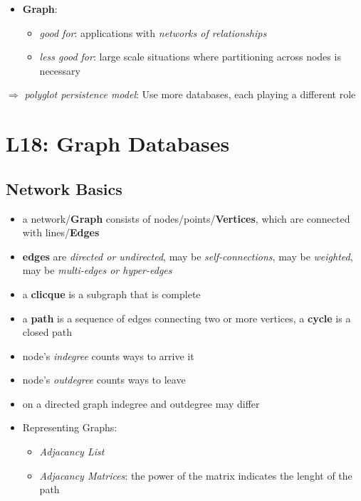 \documentclass[a4paper]{article}
\begin{document}
\begin{multicols}{3}
\begin{itemize}
\begin{itemize}
        \end{itemize}
    \item \textbf{Graph}: 
        \begin{itemize}
            \item \textit{good for}: applications with \textit{networks of relationships}
            \item \textit{less good for}: large scale situations where partitioning across nodes is necessary
        \end{itemize}
\end{itemize}
$\Rightarrow$ \textit{polyglot persistence model}: Use more databases, each playing a different role

\section{L18: Graph Databases}

\subsection{Network Basics}
\begin{itemize}
    \item a network/\textbf{Graph} consists of nodes/points/\textbf{Vertices}, which are connected with lines/\textbf{Edges} 
    \item \textbf{edges} are \textit{directed or undirected}, may be \textit{self-connections}, may be \textit{weighted}, may be \textit{multi-edges or hyper-edges}
    \item a \textbf{clicque} is a subgraph that is complete
    \item a \textbf{path} is a sequence of edges connecting two or more vertices, a \textbf{cycle} is a closed path
    \item node's \textit{indegree} counts ways to arrive it
    \item node's \textit{outdegree} counts ways to leave
    \item on a directed graph indegree and outdegree may differ
    \item Representing Graphs:
        \begin{itemize}
            \item \textit{Adjacancy List}
            \item \textit{Adjacancy Matrices}: the power of the matrix indicates the lenght of the path
        \end{itemize}
\end{itemize}


\end{multicols}
\end{document}
